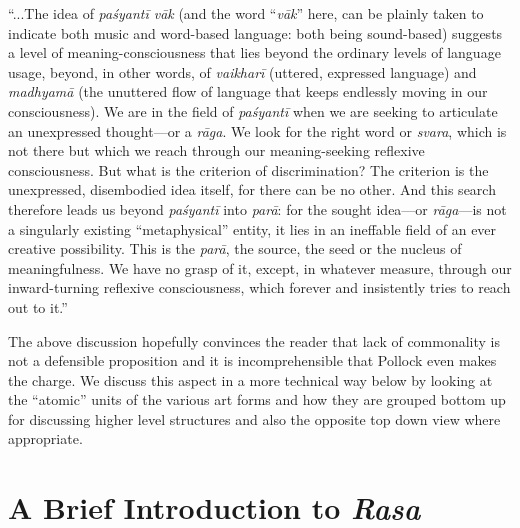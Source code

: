 \begin{myquote}
“...The idea of \textsl{paśyantī vāk} (and the word “\textsl{vāk}” here, can be plainly taken to indicate both music and word-based language: both being sound-based) suggests a level of meaning-consciousness that lies beyond the ordinary levels of language usage, beyond, in other words, of \textsl{vaikharī} (uttered, expressed language) and \textsl{madhyamā} (the unuttered flow of language that keeps endlessly moving in our consciousness). We are in the field of \textsl{paśyantī} when we are seeking to articulate an unexpressed thought---or a \textsl{rāga}. We look for the right word or \textsl{svara}, which is not there but which we reach through our meaning-seeking reflexive consciousness. But what is the criterion of discrimination? The criterion is the unexpressed, disembodied idea itself, for there can be no other. And this search therefore leads us beyond \textsl{paśyantī} into \textsl{parā}: for the sought idea---or \textsl{rāga}---is not a singularly existing “metaphysical” entity, it lies in an ineffable field of an ever creative possibility. This is the \textsl{parā}, the source, the seed or the nucleus of meaningfulness. We have no grasp of it, except, in whatever measure, through our inward-turning reflexive consciousness, which forever and insistently tries to reach out to it.”
\end{myquote}

The above discussion hopefully convinces the reader that lack of commonality is not a defensible proposition and it is incomprehensible that Pollock even makes the charge. We discuss this aspect in a more technical way below by looking at the “atomic” units of the various art forms and how they are grouped bottom up for discussing higher level structures and also the opposite top down view where appropriate.

\section{A Brief Introduction to \textsl{Rasa}}\label{chap3-sec2}

